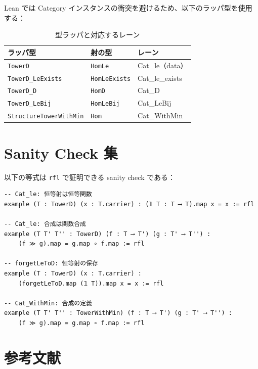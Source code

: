 \documentclass{ltjsarticle}
\theoremstyle{definition}
\begin{document}
Lean では Category インスタンスの衝突を避けるため、以下のラッパ型を使用する：

\begin{table}[htbp]
\centering
\caption{型ラッパと対応するレーン}
\begin{tabular}{@{}lll@{}}
\toprule
\textbf{ラッパ型} & \textbf{射の型} & \textbf{レーン} \\
\midrule
\texttt{TowerD} & \texttt{HomLe} & Cat\_le（data） \\
\texttt{TowerD\_LeExists} & \texttt{HomLeExists} & Cat\_le\_exists \\
\texttt{TowerD\_D} & \texttt{HomD} & Cat\_D \\
\texttt{TowerD\_LeBij} & \texttt{HomLeBij} & Cat\_LeBij \\
\texttt{StructureTowerWithMin} & \texttt{Hom} & Cat\_WithMin \\
\bottomrule
\end{tabular}
\end{table}

\section{Sanity Check 集}

以下の等式は \texttt{rfl} で証明できる sanity check である：

\begin{leanbox}
\begin{lstlisting}
-- Cat_le: 恒等射は恒等関数
example (T : TowerD) (x : T.carrier) : (𝟙 T : T ⟶ T).map x = x := rfl

-- Cat_le: 合成は関数合成
example (T T' T'' : TowerD) (f : T ⟶ T') (g : T' ⟶ T'') :
    (f ≫ g).map = g.map ∘ f.map := rfl

-- forgetLeToD: 恒等射の保存
example (T : TowerD) (x : T.carrier) :
    (forgetLeToD.map (𝟙 T)).map x = x := rfl

-- Cat_WithMin: 合成の定義
example (T T' T'' : TowerWithMin) (f : T ⟶ T') (g : T' ⟶ T'') :
    (f ≫ g).map = g.map ∘ f.map := rfl
\end{lstlisting}
\end{leanbox}

\section*{参考文献}
\end{document}
